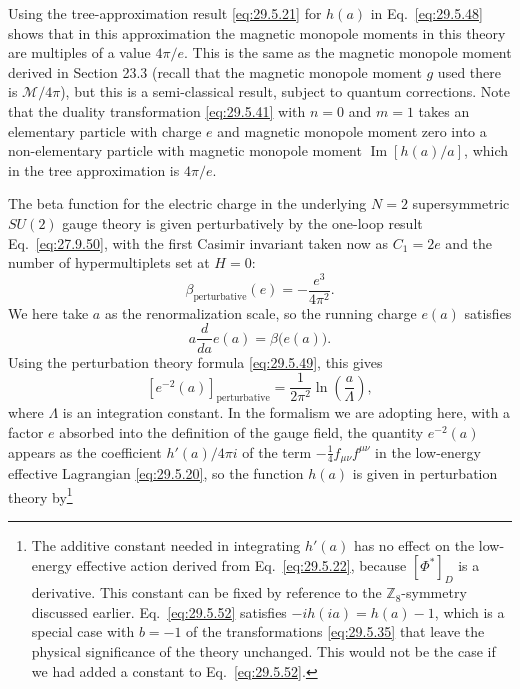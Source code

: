 Using the tree-approximation result \eqref{eq:29.5.21} for \(h(a)\) in
Eq.~\eqref{eq:29.5.48} shows that in this approximation the magnetic
monopole moments in this theory are multiples of a value \(4\pi/e\). This is
the same as the magnetic monopole moment derived in Section 23.3 (recall that
the magnetic monopole moment \(g\) used there is \(\mathcal{M}/4\pi\)), but
this is a semi-classical result, subject to quantum corrections. Note that
the duality transformation \eqref{eq:29.5.41} with \(n=0\) and \(m=1\)
takes an elementary particle with charge \(e\) and magnetic monopole moment
zero into a non-elementary particle with magnetic monopole moment
\(\operatorname{Im}[h(a)/a]\), which in the tree approximation is \(4\pi/e\).

The beta function for the electric charge in the underlying \(N=2\)
supersymmetric \(SU(2)\) gauge theory is given perturbatively by the one-loop
result Eq.~\eqref{eq:27.9.50}, with the first Casimir invariant taken now as
\(C_1=2e\) and the number of hypermultiplets set at \(H=0\):
\begin{equation}
  \beta_{\mathrm{perturbative}}(e)=-\frac{e^3}{4\pi^2}.
  \tag{29.5.49}\label{eq:29.5.49}
\end{equation}
We here take \(a\) as the renormalization scale, so the running charge
\(e(a)\) satisfies
\begin{equation}
  a\frac{d}{da}e(a)=\beta\bigl(e(a)\bigr).
  \tag{29.5.50}\label{eq:29.5.50}
\end{equation}
Using the perturbation theory formula \eqref{eq:29.5.49}, this gives
\begin{equation}
  \left[e^{-2}(a)\right]_{\mathrm{perturbative}}
  =\frac{1}{2\pi^2}\ln\left(\frac{a}{\Lambda}\right),
  \tag{29.5.51}\label{eq:29.5.51}
\end{equation}
where \(\Lambda\) is an integration constant. In the formalism we are
adopting here, with a factor \(e\) absorbed into the definition of the gauge
field, the quantity \(e^{-2}(a)\) appears as the coefficient \(h'(a)/4\pi i\)
of the term \(-\tfrac14f_{\mu\nu}f^{\mu\nu}\) in the low-energy effective
Lagrangian \eqref{eq:29.5.20}, so the function \(h(a)\) is
given in perturbation theory by\footnote{The additive constant needed in
integrating \(h'(a)\) has no effect on the low-energy effective action
derived from Eq.~\eqref{eq:29.5.22}, because \([\Phi^*]_D\) is a derivative.
This constant can be fixed by reference to the \(\mathbb{Z}_8\)-symmetry
discussed earlier. Eq.~\eqref{eq:29.5.52} satisfies
\(-ih(ia)=h(a)-1\), which is a special case with \(b=-1\) of the
transformations \eqref{eq:29.5.35} that leave the physical significance of
the theory unchanged. This would not be the case if we had added a constant
to Eq.~\eqref{eq:29.5.52}.}
